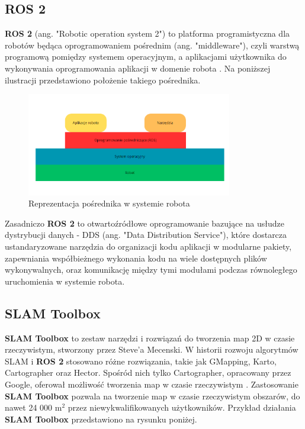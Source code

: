 \documentclass[a4paper,twoside,12pt]{book}
\begin{document}
\subsection{ROS 2}
\textbf{ROS 2} (ang. "Robotic operation system 2") to platforma programistyczna dla robotów będąca oprogramowaniem pośrednim (ang. "middleware"), czyli warstwą programową pomiędzy systemem operacyjnym, a aplikacjami użytkownika do wykonywania oprogramowania aplikacji w domenie robota \cite{bib:ros2Concise}. Na poniższej ilustracji przedstawiono położenie takiego pośrednika.
\begin{figure}[!hb]
	\centering
	\includegraphics[width=0.8\textwidth]{images/middle.png}
	\caption{Reprezentacja pośrednika w systemie robota \cite{bib:ros2Concise}}
	\label{fig:middle}
	\end{figure}
\newline
Zasadniczo \textbf{ROS 2} to otwartoźródłowe oprogramowanie bazujące na usłudze dystrybucji danych - DDS (ang. "Data Distribution Service"), które dostarcza ustandaryzowane narzędzia do organizacji kodu aplikacji w modularne pakiety, zapewniania współbieżnego wykonania kodu na wiele dostępnych plików wykonywalnych, oraz komunikację między tymi modułami podczas równoległego uruchomienia w systemie robota\cite{bib:guide}.

\newpage
\subsection{SLAM Toolbox}
\textbf{SLAM Toolbox} to zestaw narzędzi i rozwiązań do tworzenia map 2D w czasie rzeczywistym, stworzony przez Steve'a Mecenski.
W historii rozwoju algorytmów SLAM i \textbf{ROS 2} stosowano różne rozwiązania, takie jak GMapping, Karto, Cartographer oraz Hector. Spośród nich tylko Cartographer, opracowany przez Google, oferował możliwość tworzenia map w czasie rzeczywistym \cite{bib:slamtoolbox}.
Zastosowanie \textbf{SLAM Toolbox} pozwala na tworzenie map w czasie rzeczywistym obszarów, do nawet 24 000 m$^2$ przez niewykwalifikowanych użytkowników. Przykład działania \textbf{SLAM Toolbox} przedstawiono na rysunku poniżej.
\end{document}
